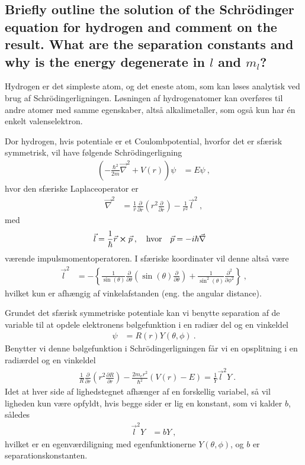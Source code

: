 \subsection{Briefly outline the solution of the Schrödinger equation for hydrogen and comment on the result. What are the separation constants and why is the energy degenerate in $l$ and $m_l$?}


Hydrogen er det simpleste atom, og det eneste atom, som kan løses analytisk ved brug af Schrödingerligningen. Løsningen af hydrogenatomer kan overføres til andre atomer med samme egenskaber, altså alkalimetaller, som også kun har én enkelt valenselektron.

Dor hydrogen, hvis potentiale er et Coulombpotential, hvorfor det er sfærisk symmetrisk, vil have følgende Schrödingerligning
\begin{align}
    \left(-\frac{\hbar^2}{2m}\Vec{\nabla}^2 + V(r)\right)\psi &= E\psi \: ,
\end{align}
hvor den sfæriske Laplaceoperator er
\begin{align} \label{eq:Q05_SphericalNabla^2}
    \Vec{\nabla}^2 &= \frac{1}{r} \frac{\partial}{\partial r}\left(r^2 \frac{\partial}{\partial r}\right) - \frac{1}{r^2}\Vec{l}^2 \: ,
\end{align}
med
\begin{align}
    \Vec{l} &= \frac{1}{\hbar} \Vec{r} \cross \Vec{p} \: , \quad \text{hvor} \quad \Vec{p} = -i\hbar\Vec{\nabla}
\end{align}
værende impulsmomentoperatoren. I sfæriske koordinater vil denne altså være
\begin{align}
    \Vec{l}^2 &= -\left\{\frac{1}{\sin(\theta)}\frac{\partial}{\partial \theta}\left(\sin(\theta)\frac{\partial}{\partial \theta}\right) + \frac{1}{\sin^2(\theta)}\frac{\partial^2}{\partial \phi^2}\right\} \: ,
\end{align}
hvilket kun er afhængig af vinkelafstanden (eng. the angular distance).

Grundet det sfærisk symmetriske potentiale kan vi benytte separation af de variable til at opdele elektronens bølgefunktion i en radiær del og en vinkeldel
\begin{align}
    \psi &= R(r)Y(\theta,\phi) \: .
\end{align}
Benytter vi denne bølgefunktion i Schrödingerligningen får vi en opsplitning i en radiærdel og en vinkeldel
\begin{align} \label{eq:Q05_EquationToLaterUse}
    &\frac{1}{R}\frac{\partial}{\partial r} \left(r^2 \frac{\partial R}{\partial r}\right) - \frac{2m_er^2}{\hbar^2}\left(V(r) - E\right) = \frac{1}{Y}\Vec{l}^2Y \: .
\end{align}
Idet at hver side af lighedstegnet afhænger af en forskellig variabel, så vil ligheden kun være opfyldt, hvis begge sider er lig en konstant, som vi kalder $b$, således
\begin{align} \label{eq:Q05_EigenvalueEquation}
    \Vec{l}^2Y &= bY \: ,
\end{align}
hvilket er en egenværdiligning med egenfunktionerne $Y(\theta,\phi)$, og $b$ er separationskonstanten.


